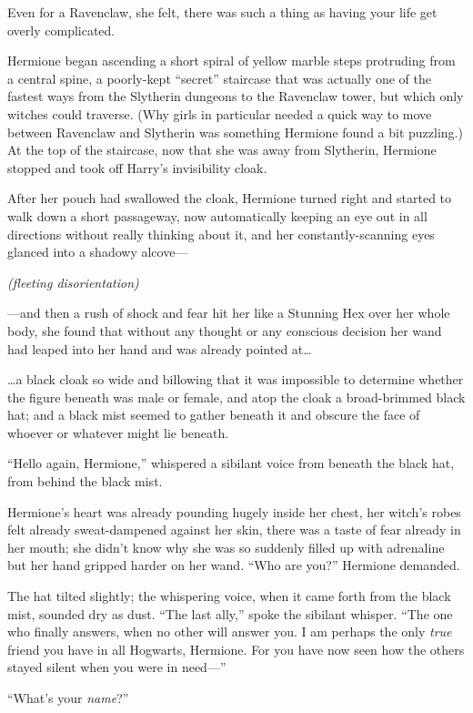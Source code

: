 Even for a Ravenclaw, she felt, there was such a thing as having your life get overly complicated.

Hermione began ascending a short spiral of yellow marble steps protruding from a central spine, a poorly-kept “secret” staircase that was actually one of the fastest ways from the Slytherin dungeons to the Ravenclaw tower, but which only witches could traverse. (Why girls in particular needed a quick way to move between Ravenclaw and Slytherin was something Hermione found a bit puzzling.) At the top of the staircase, now that she was away from Slytherin, Hermione stopped and took off Harry’s invisibility cloak.

After her pouch had swallowed the cloak, Hermione turned right and started to walk down a short passageway, now automatically keeping an eye out in all directions without really thinking about it, and her constantly-scanning eyes glanced into a shadowy alcove—

\emph{(fleeting disorientation)}

—and then a rush of shock and fear hit her like a Stunning Hex over her whole body, she found that without any thought or any conscious decision her wand had leaped into her hand and was already pointed at…

…a black cloak so wide and billowing that it was impossible to determine whether the figure beneath was male or female, and atop the cloak a broad-brimmed black hat; and a black mist seemed to gather beneath it and obscure the face of whoever or whatever might lie beneath.

“Hello again, Hermione,” whispered a sibilant voice from beneath the black hat, from behind the black mist.

Hermione’s heart was already pounding hugely inside her chest, her witch’s robes felt already sweat-dampened against her skin, there was a taste of fear already in her mouth; she didn’t know why she was so suddenly filled up with adrenaline but her hand gripped harder on her wand. “Who are you?” Hermione demanded.

The hat tilted slightly; the whispering voice, when it came forth from the black mist, sounded dry as dust. “The last ally,” spoke the sibilant whisper. “The one who finally answers, when no other will answer you. I am perhaps the only \emph{true} friend you have in all Hogwarts, Hermione. For you have now seen how the others stayed silent when you were in need—”

“What’s your \emph{name}?”

